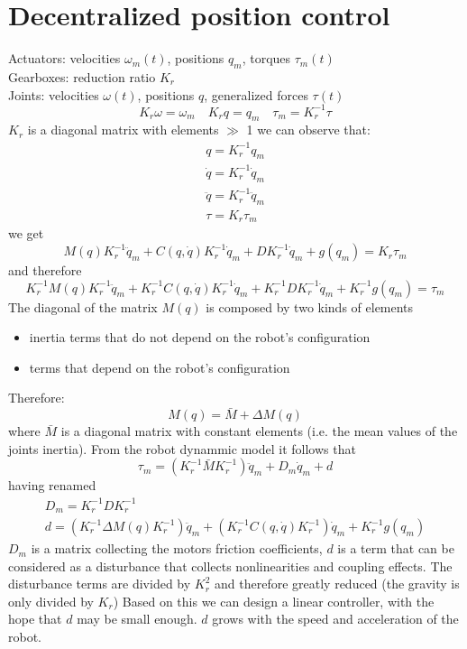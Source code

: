 \documentclass{book}
\begin{document}
\section{Decentralized position control}
Actuators: velocities $\omega_m(t)$, positions $q_m$, torques $\tau_m(t)$\\
Gearboxes: reduction ratio $K_r$\\
Joints: velocities $\omega(t)$, positions $q$, generalized forces $\tau(t)$
\[
    K_r\omega = \omega_m \quad K_rq=q_m \quad \tau_m = K_r^{-1}\tau
\]
$K_r$ is a diagonal matrix with elements  $\gg$ 1
we can observe that:
\begin{gather*}
    q= K_r^{-1}q_m\\
    \dot{q}=K_r^{-1}\dot{q}_m\\
    \ddot{q}=K_r^{-1}\ddot{q}_m\\
    \tau=K_r\tau_m
\end{gather*}
we get
\[
    M(q)K_r^{-1}\ddot{q}_m + C(q,\dot{q})K_r^{-1}\dot{q}_m+DK_r^{-1}\dot{q}_m+g(q_m)=K_r\tau_m
\]
and therefore
\[
  K_r^{-1}M(q)K_r^{-1}\ddot{q}_m + K_r^{-1}C(q,\dot{q})K_r^{-1}\dot{q}_m+K_r^{-1}DK_r^{-1}\dot{q}_m+K_r^{-1}g(q_m)=\tau_m
\]
The diagonal of the matrix $M(q)$ is composed by two kinds of elements
\begin{itemize}
    \item inertia terms that do not depend on the robot's configuration
    \item terms that depend on the robot's configuration
\end{itemize}
Therefore:
\[
    M(q)=\bar{M}+\Delta M(q)
\]
where $\bar{M}$ is a diagonal matrix with constant elements (i.e. the mean values of the joints inertia). From the robot dynammic model it follows that
\[
    \tau_m=(K_r^{-1}\bar{M}K_r^{-1})\ddot{q}_m+D_m\dot{q}_m+d
\]
having renamed
\begin{gather*}
    D_m=K_r^{-1}DK_r^{-1}\\
    d=(K_r^{-1}\Delta M(q)K_r^{-1})\ddot{q}_m+(K_r^{-1}C(q,\dot{q})K_r^{-1})\dot{q}_m+K_r^{-1}g(q_m)
\end{gather*}
$D_m$ is a matrix collecting the motors friction coefficients, $d$ is a term that can be considered as a disturbance that collects nonlinearities and coupling effects. The disturbance terms are divided by $K_r^2$ and therefore greatly reduced (the gravity is only divided by $K_r$)
Based on this we can design a linear controller, with the hope that $d$ may be small enough. $d$ grows with the speed and acceleration of the robot.
\end{document}
